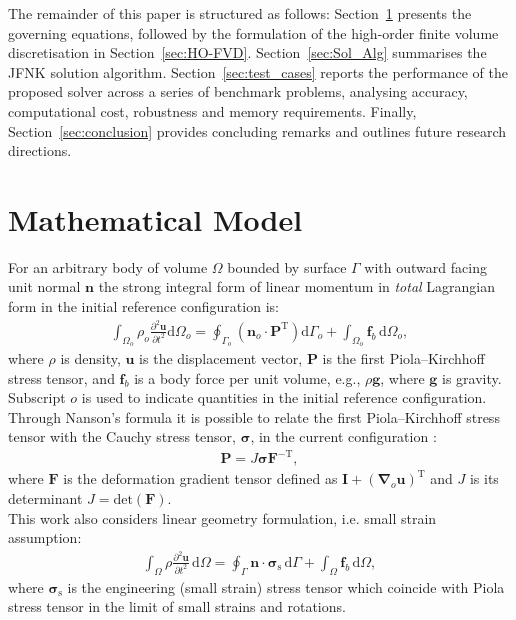 \documentclass[review,3p]{elsarticle}
\newcommand{\bb}{\boldsymbol}
\begin{document}
The remainder of this paper is structured as follows: Section~\ref{sec:math_model} presents the governing equations, followed by the formulation of the high-order finite volume discretisation in Section~\ref{sec:HO-FVD}. Section~\ref{sec:Sol_Alg} summarises the JFNK solution algorithm. Section~\ref{sec:test_cases} reports the performance of the proposed solver across a series of benchmark problems, analysing accuracy, computational cost, robustness and memory requirements. Finally, Section~\ref{sec:conclusion} provides concluding remarks and outlines future research directions.
%
%
\section{Mathematical Model}
\label{sec:math_model}
%
%
For an arbitrary body of volume $\Omega$ bounded by surface $\Gamma$ with outward facing unit normal $\bb{n}$
the strong integral form of linear momentum in \emph{total} Lagrangian form  in the initial reference configuration is:
%
\begin{eqnarray} \label{eqn:momentum_TL}
	\int_{\Omega_o} \rho_o \frac{\partial^2 \bb{u} }{\partial t^2} \text{d}\Omega_o
	=
	\oint_{\Gamma_o} \left( \bb{n}_o \cdot  \bb{P}^{\text{T}}\right)  \text{d}\Gamma_o
	+ \int_{\Omega_o}  \bb{f}_b \, \text{d}\Omega_o,
\end{eqnarray}
%
where $\rho$ is density, $\bb{u}$ is the displacement vector, $\bb{P}$ is the first Piola–Kirchhoff stress tensor,
and $\bb{f}_b$ is a body force per unit volume, e.g., $\rho \bb{g}$, where $\bb{g}$ is gravity.
Subscript $o$ is used to indicate quantities in the initial reference configuration.
Through Nanson's formula it is possible to relate the first Piola–Kirchhoff stress tensor with the Cauchy stress tensor, $\bb{\sigma}$, in the current configuration \cite{Gurtin1981, Gurtin2010}:
%
\begin{eqnarray} \label{eqn:nanson}
	\bb{P}=J \bb{\sigma} \bb{F}^{-\text{T}},
\end{eqnarray}
%
where $\bb{F}$ is the deformation gradient tensor defined as $\bb{I} + (\bb{\nabla}_o \bb{u})^{\text{T}}$ and $J$ is its determinant $J = \text{det}(\bb{F})$.
\\
This work also considers linear geometry formulation, i.e. small strain assumption:
%
\begin{eqnarray} \label{eqn:momentum_lingeom}
	\int_{\Omega} \rho \frac{\partial^2 \bb{u} }{\partial t^2} \, \text{d}\Omega
	=
	\oint_{\Gamma} \bb{n} \cdot \bb{\sigma}_\text{s} \,  \text{d}\Gamma
	+ \int_{\Omega}  \bb{f}_b \, \text{d}\Omega,
\end{eqnarray}
%
where $\bb{\sigma}_\text{s}$ is the engineering (small strain) stress tensor which coincide with Piola stress tensor in the limit of small strains and rotations.
\end{document}
